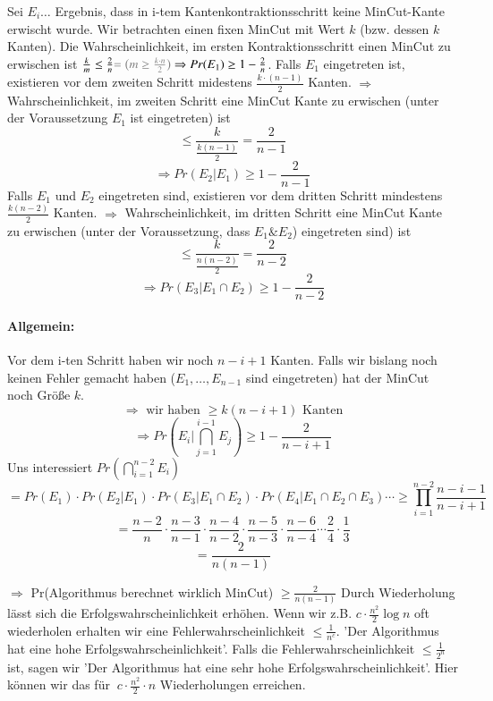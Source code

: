 \minisec{} Sei $E_i \dots$ Ergebnis, dass in i-tem Kantenkontraktionsschritt keine MinCut-Kante erwischt wurde. Wir betrachten einen fixen MinCut mit Wert $k$ (bzw. dessen $k$ Kanten). Die Wahrscheinlichkeit, im ersten Kontraktionsschritt einen MinCut zu erwischen ist $\frac{k}{m} \leq \frac{2}{n} \textcolor{gray}{= \big( m \geq \frac{k \cdot n}{2} \big)} \Rightarrow Pr(E_1) \geq 1-\frac{2}{n}$.
\minisec{} Falls $E_1$ eingetreten ist, existieren vor dem zweiten Schritt midestens $\frac{k \cdot (n-1)}{2}$ Kanten.
\minisec{} $\Rightarrow$ Wahrscheinlichkeit, im zweiten Schritt eine MinCut Kante zu erwischen (unter der Voraussetzung $E_1$ ist eingetreten) ist
$$ \leq \frac{k}{\frac{k(n-1)}{2}} = \frac{2}{n-1}$$
$$ \Rightarrow Pr(E_2|E_1) \geq 1 - \frac{2}{n-1} $$
\minisec{} Falls $E_1$ und $E_2$ eingetreten sind, existieren vor dem dritten Schritt mindestens $\frac{k(n-2)}{2}$ Kanten.
\minisec{} $\Rightarrow$ Wahrscheinlichkeit, im dritten Schritt eine MinCut Kante zu erwischen (unter der Voraussetzung, dass $E_1 \& E_2$) eingetreten sind) ist
$$ \leq \frac{k}{\frac{n(n-2)}{2}} = \frac{2}{n-2} $$
$$ \Rightarrow Pr(E_3|E_1 \cap E_2) \geq 1 - \frac{2}{n-2} $$

\paragraph*{Allgemein:} Vor dem i-ten Schritt haben wir noch $n-i+1$ Kanten. Falls wir bislang  noch keinen Fehler gemacht haben ($E_1,\dots, E_{n-1}$ sind eingetreten) hat der MinCut noch Größe $k$.
$$ \Rightarrow \text{ wir haben } \geq k(n-i+1) \text{ Kanten} $$
$$ \Rightarrow Pr(E_i|\bigcap_{j=1}^{i-1} E_j) \geq 1-\frac{2}{n-i+1} $$
Uns interessiert $Pr(\bigcap\limits_{i=1}^{n-2} E_i)$
$$ = Pr(E_1) \cdot Pr(E_2|E_1) \cdot Pr(E_3|E_1 \cap E_2) \cdot Pr(E_4|E_1 \cap E_2 \cap E_3) \cdots \geq \prod\limits_{i=1}^{n-2} \frac{n-i-1}{n-i+1} $$
$$ = \frac{n-2}{n} \cdot \frac{n-3}{n-1} \cdot \frac{n-4}{n-2} \cdot \frac{n-5}{n-3} \cdot \frac{n-6}{n-4} \cdots \frac{2}{4} \cdot \frac{1}{3} $$
$$ = \frac{2}{n(n-1)} $$

$\Rightarrow$ Pr(Algorithmus berechnet wirklich MinCut) $\geq \frac{2}{n(n-1)}$
\minisec{} Durch Wiederholung lässt sich die Erfolgswahrscheinlichkeit erhöhen. Wenn wir z.B. $c \cdot \frac{n^2}{2} \log n$ oft wiederholen erhalten wir eine Fehlerwahrscheinlichkeit $\leq \frac{1}{n^c}$. 'Der Algorithmus hat eine hohe Erfolgswahrscheinlichkeit'.
\minisec{} Falls die Fehlerwahrscheinlichkeit $\leq \frac{1}{2^n}$ ist, sagen wir 'Der Algorithmus hat eine sehr hohe Erfolgswahrscheinlichkeit'. Hier können wir das für $~ c \cdot \frac{n^2}{2} \cdot n$ Wiederholungen erreichen.

